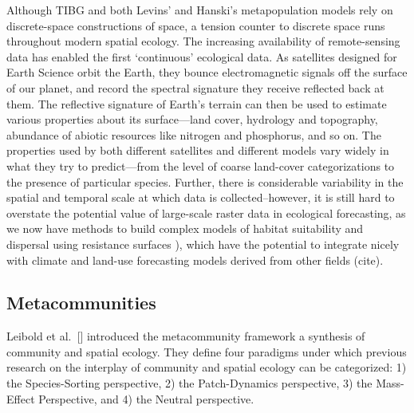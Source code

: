 \documentclass[]{article}
\begin{document}
Although TIBG and both Levins' and Hanski's metapopulation models rely
on discrete-space constructions of space, a tension counter to discrete
space runs throughout modern spatial ecology. The increasing
availability of remote-sensing data has enabled the first `continuous'
ecological data. As satellites designed for Earth Science orbit the
Earth, they bounce electromagnetic signals off the surface of our
planet, and record the spectral signature they receive reflected back at
them. The reflective signature of Earth's terrain can then be used to
estimate various properties about its surface---land cover, hydrology
and topography, abundance of abiotic resources like nitrogen and
phosphorus, and so on. The properties used by both different satellites
and different models vary widely in what they try to predict---from the
level of coarse land-cover categorizations to the presence of particular
species. Further, there is considerable variability in the spatial and
temporal scale at which data is collected--however, it is still hard to
overstate the potential value of large-scale raster data in ecological
forecasting, as we now have methods to build complex models of habitat
suitability and dispersal using resistance surfaces \citep{cite}),
which have the potential to integrate nicely with climate and land-use
forecasting models derived from other fields (cite).


\hypertarget{metacommunities}{%
\subsection{Metacommunities}\label{metacommunities}}

Leibold et al.~{[}\citep{leibold_metacommunity_2004}{]} introduced
the metacommunity framework a synthesis of community and spatial
ecology. They define four paradigms under which previous research on the
interplay of community and spatial ecology can be categorized: 1) the
Species-Sorting perspective, 2) the Patch-Dynamics perspective, 3) the
Mass-Effect Perspective, and 4) the Neutral perspective.
\end{document}
